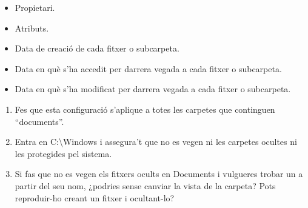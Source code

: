 \documentclass[
  a4paper,
]{article}
\providecommand{\tightlist}{%
  \setlength{\itemsep}{0pt}\setlength{\parskip}{0pt}}
\begin{document}
\begin{itemize}
\tightlist
\item
  Propietari.
\item
  Atributs.
\item
  Data de creació de cada fitxer o subcarpeta.
\item
  Data en què s'ha accedit per darrera vegada a cada fitxer o
  subcarpeta.
\item
  Data en què s'ha modificat per darrera vegada a cada fitxer o
  subcarpeta.
\end{itemize}

\begin{enumerate}
\def\labelenumi{\arabic{enumi}.}
\setcounter{enumi}{2}
\tightlist
\item
  Fes que esta configuració s'aplique a totes les carpetes que
  continguen ``documents''.
\item
  Entra en C:\textbackslash Windows i assegura't que no es vegen ni les
  carpetes ocultes ni les protegides pel sistema.
\item
  Si fas que no es vegen els fitxers ocults en Documents i vulgueres
  trobar un a partir del seu nom, ¿podries sense canviar la vista de la
  carpeta? Pots reproduir-ho creant un fitxer i ocultant-lo?
\end{enumerate}
\end{document}
